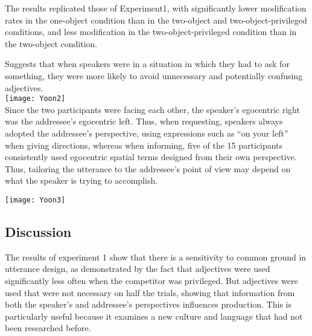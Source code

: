 \documentclass{article}
\begin{document}
\begin{multicols}{2}
\begin{description}
	The results replicated those of Experiment1, with significantly lower modification rates in the one-object condition than in the two-object and two-object-privileged conditions, and less modification in the two-object-privileged condition than in the two-object condition.\\\vspace{4mm}
	
	Suggests that when speakers were in a situation in which they had to ask for something, they were more likely to avoid unnecessary and potentially confusing adjectives.\\\vspace{3mm}
	\texttt{[image: Yoon2]}\\
	Since the two participants were facing each other, the speaker's egocentric right was the addressee's egocentric left. Thus, when requesting, speakers always adopted the addressee's perspective, using expressions such as “on your left” when giving directions, whereas when informing, five of the 15 participants consistently used egocentric spatial terms designed from their own perspective. Thus, tailoring the utterance to the addressee's point of view may depend on what the speaker is trying to accomplish.
	
	\texttt{[image: Yoon3]}
\end{description}
\subsection{Discussion}
The results of experiment 1 show that there is a sensitivity to common ground in utterance design, as demonstrated by the fact that adjectives were used significantly less often when the competitor was privileged.  But adjectives were used that were not necessary on half the trials, showing that information from both the speaker's and addressee's perspectives influences production. This is particularly useful because it examines a new culture and language that had not been researched before.\\\vspace{4mm}


\end{multicols}
\end{document}

